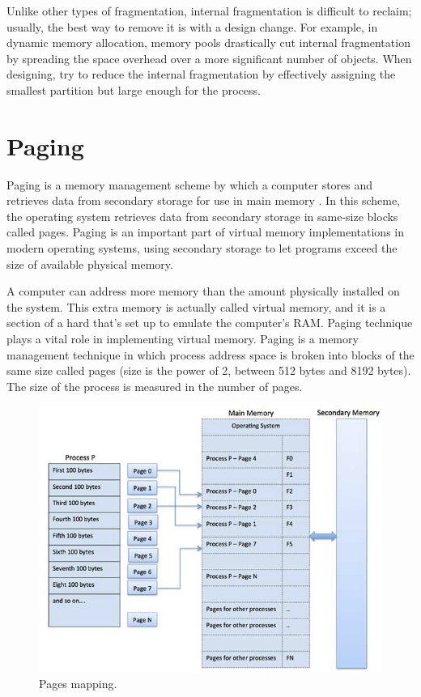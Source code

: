 \documentclass[doc,natbib,12pt]{apa6}
\begin{document}
	Unlike other types of fragmentation, internal fragmentation is difficult to reclaim; usually, the best way to remove it is with a design change. For example, in dynamic memory allocation, memory pools drastically cut internal fragmentation by spreading the space overhead over a more significant number of objects. When designing, try to reduce the internal fragmentation by effectively assigning the smallest partition but large enough for the process.
	
	\newpage
	\section{Paging} \label{chp:paging}
	Paging is a memory management scheme by which a computer stores and retrieves data from secondary storage for use in main memory \citep{Arpaci-Dusseau2014}. In this scheme, the operating system retrieves data from secondary storage in same-size blocks called pages. Paging is an important part of virtual memory implementations in modern operating systems, using secondary storage to let programs exceed the size of available physical memory.
	
	A computer can address more memory than the amount physically installed on
	the system. This extra memory is actually called virtual memory, and it is a
	section of a hard that's set up to emulate the computer's RAM. Paging
	technique plays a vital role in implementing virtual memory.
	Paging is a memory management technique in which process address space is
	broken into blocks of the same size called pages (size is the power of 2, between 512 bytes and 8192 bytes). The size of the process is measured in the number
	of pages.
	
	\begin{figure}[h]
		\centering
		\includegraphics[width=1\textwidth]{paging.png}
		\caption{\label{fig:paging}Pages mapping. \citep{tutorialspoint2018}}
	\end{figure}
	
\end{document}
